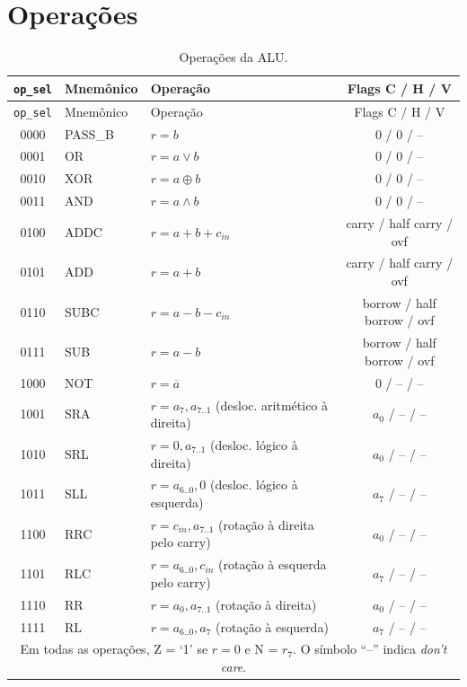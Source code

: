 \newpage
\section{Operações}

\begin{longtable}{c l p{7.2cm} c}
\caption{Operações da ALU.}\label{tab:operacoes}\\
\hline \texttt{op\_sel} & Mnemônico & Operação & Flags C / H / V \\ \hline \endfirsthead
\hline \texttt{op\_sel} & Mnemônico & Operação & Flags C / H / V \\ \hline \endhead
0000 & PASS\_B & $r = b$ & 0 / 0 / -- \\
0001 & OR & $r = a \lor b$ & 0 / 0 / -- \\
0010 & XOR & $r = a \oplus b$ & 0 / 0 / -- \\
0011 & AND & $r = a \land b$ & 0 / 0 / -- \\
0100 & ADDC & $r = a + b + c_{in}$ & carry / half carry / ovf \\
0101 & ADD & $r = a + b$ & carry / half carry / ovf \\
0110 & SUBC & $r = a - b - c_{in}$ & borrow / half borrow / ovf \\
0111 & SUB & $r = a - b$ & borrow / half borrow / ovf \\
1000 & NOT & $r = \overline{a}$ & 0 / -- / -- \\
1001 & SRA & $r = a_7, a_{7..1}$ (desloc. aritmético à direita) & $a_0$ / -- / -- \\
1010 & SRL & $r = 0, a_{7..1}$ (desloc. lógico à direita) & $a_0$ / -- / -- \\
1011 & SLL & $r = a_{6..0}, 0$ (desloc. lógico à esquerda) & $a_7$ / -- / -- \\
1100 & RRC & $r = c_{in}, a_{7..1}$ (rotação à direita pelo carry) & $a_0$ / -- / -- \\
1101 & RLC & $r = a_{6..0}, c_{in}$ (rotação à esquerda pelo carry) & $a_7$ / -- / -- \\
1110 & RR & $r = a_0, a_{7..1}$ (rotação à direita) & $a_0$ / -- / -- \\
1111 & RL & $r = a_{6..0}, a_7$ (rotação à esquerda) & $a_7$ / -- / -- \\ \hline
\multicolumn{4}{p{13cm}}{\footnotesize Em todas as operações, Z = `1' se $r = 0$ e N = $r_7$. O símbolo ``--'' indica \textit{don't care}.} \\
\end{longtable}

